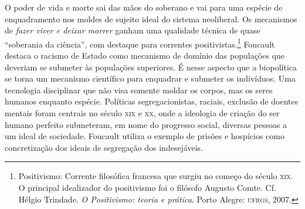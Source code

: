 O poder de vida e morte sai das mãos do soberano e vai para uma espécie
de enquadramento nos moldes de sujeito ideal do sistema neoliberal. Os
mecanismos de \textit{fazer viver e deixar morrer} ganham uma qualidade
técnica de quase ``soberania da ciência'', com destaque para correntes
positivistas.\footnote{Positivismo: Corrente filosófica francesa que
  surgiu no começo do século \textsc{xix}. O principal idealizador do positivismo
  foi o filósofo Augusto Comte. Cf. Hélgio Trindade. \textit{O Positivismo: teoria e prática}. Porto Alegre: \textsc{ufrgs}, 2007.} Foucault destaca o
racismo de Estado como mecanismo de domínio das populações que deveriam
se submeter às populações superiores. É nesse aspecto que a biopolítica
se torna um mecanismo científico para enquadrar e submeter os
indivíduos. Uma tecnologia disciplinar que não visa somente moldar os
corpos, mas os seres humanos enquanto espécie. Políticas
segregacionistas, raciais, exclusão de doentes mentais foram centrais no
século \textsc{xix} e \textsc{xx}, onde a ideologia de criação do ser humano perfeito
submeteram, em nome do progresso social, diversas pessoas a um
ideal de sociedade. Foucault utiliza o exemplo de prisões e hospícios
como concretização dos ideais de segregação dos indesejáveis.

